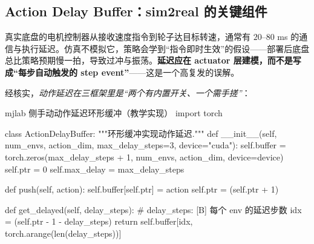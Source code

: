 \subsection{Action Delay Buffer：sim2real 的关键组件}
\label{sec:rlmc-wh-delay}

真实底盘的电机控制器从接收速度指令到轮子达目标转速，通常有 $20$--$80$ ms 的通信与执行延迟。仿真不模拟它，策略会学到“指令即时生效”的假设——部署后底盘总比策略预期慢一拍，导致过冲与振荡。\textbf{延迟应在 actuator 层建模，而不是写成“每步自动触发的 step event”}——这是一个高复发的误解。

\begin{note}[三框架动作延迟对照：Isaac=内置 actuator，UniLab=配置标志，mjlab=手动缓冲]
经核实，\emph{动作延迟在三框架里是“两个有内置开关、一个需手搓”}：
\end{note}

\begin{codebox}[Python]{mjlab 侧手动动作延迟环形缓冲（教学实现）}
import torch

class ActionDelayBuffer:
    """环形缓冲实现动作延迟."""
    def __init__(self, num_envs, action_dim, max_delay_steps=3, device="cuda"):
        self.buffer = torch.zeros(max_delay_steps + 1, num_envs, action_dim, device=device)
        self.ptr = 0
        self.max_delay = max_delay_steps

    def push(self, action):
        self.buffer[self.ptr] = action
        self.ptr = (self.ptr + 1) %

    def get_delayed(self, delay_steps):       # delay_steps: [B] 每个 env 的延迟步数
        idx = (self.ptr - 1 - delay_steps) %
        return self.buffer[idx, torch.arange(len(delay_steps))]
\end{codebox}

